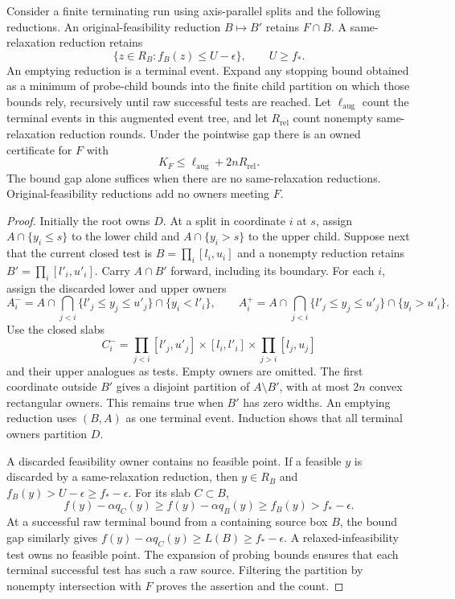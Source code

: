 \begin{lemma}\label{cert:lem-events}
Consider a finite terminating run using axis-parallel splits and the
following reductions. An original-feasibility reduction $B\mapsto B'$
retains $F\cap B$. A same-relaxation reduction retains
\[
 \{z\in R_B:f_B(z)\leq U-\epsilon\},\qquad U\geq f_*.
\]
An emptying reduction is a terminal event. Expand any stopping bound
obtained as a minimum of probe-child bounds into the finite child
partition on which those bounds rely, recursively until raw successful
tests are reached. Let $\ell_{\mathrm{aug}}$ count the terminal events in
this augmented event tree, and let $R_{\mathrm{rel}}$ count nonempty
same-relaxation reduction rounds. Under the pointwise gap there is an
owned certificate for $F$ with
\begin{equation}\label{cert:eq-event-count}
 K_F\leq\ell_{\mathrm{aug}}+2nR_{\mathrm{rel}}.
\end{equation}
The bound gap alone suffices when there are no same-relaxation reductions.
Original-feasibility reductions add no owners meeting $F$.
\end{lemma}

\begin{proof}
Initially the root owns $D$. At a split in coordinate $i$ at $s$, assign
$A\cap\{y_i\leq s\}$ to the lower child and
$A\cap\{y_i>s\}$ to the upper child. Suppose next that the current
closed test is $B=\prod_i[l_i,u_i]$ and a nonempty reduction retains
$B'=\prod_i[l'_i,u'_i]$. Carry $A\cap B'$ forward, including its boundary.
For each $i$, assign the discarded lower and upper owners
\[
 A_i^- = A\cap\bigcap_{j<i}\{l'_j\leq y_j\leq u'_j\}
             \cap\{y_i<l'_i\},\qquad
 A_i^+ = A\cap\bigcap_{j<i}\{l'_j\leq y_j\leq u'_j\}
             \cap\{y_i>u'_i\}.
\]
Use the closed slabs
\[
 C_i^- =\prod_{j<i}[l'_j,u'_j]\times[l_i,l'_i]
                  \times\prod_{j>i}[l_j,u_j]
\]
and their upper analogues as tests. Empty owners are omitted. The first
coordinate outside $B'$ gives a disjoint partition of $A\setminus B'$,
with at most $2n$ convex rectangular owners. This remains true when
$B'$ has zero widths. An emptying reduction uses $(B,A)$ as one terminal
event. Induction shows that all terminal owners partition $D$.

A discarded feasibility owner contains no feasible point. If a feasible
$y$ is discarded by a same-relaxation reduction, then $y\in R_B$ and
$f_B(y)>U-\epsilon\geq f_*-\epsilon$. For its slab $C\subset B$,
\[
 f(y)-\alpha q_C(y)\geq f(y)-\alpha q_B(y)
                         \geq f_B(y)>f_*-\epsilon.
\]
At a successful raw terminal bound from a containing source box $B$,
the bound gap similarly gives
$f(y)-\alpha q_C(y)\geq L(B)\geq f_*-\epsilon$.
A relaxed-infeasibility test owns no feasible point. The expansion of
probing bounds ensures that each terminal successful test has such a raw
source. Filtering the partition by nonempty intersection with $F$ proves
the assertion and the count.
\end{proof}

